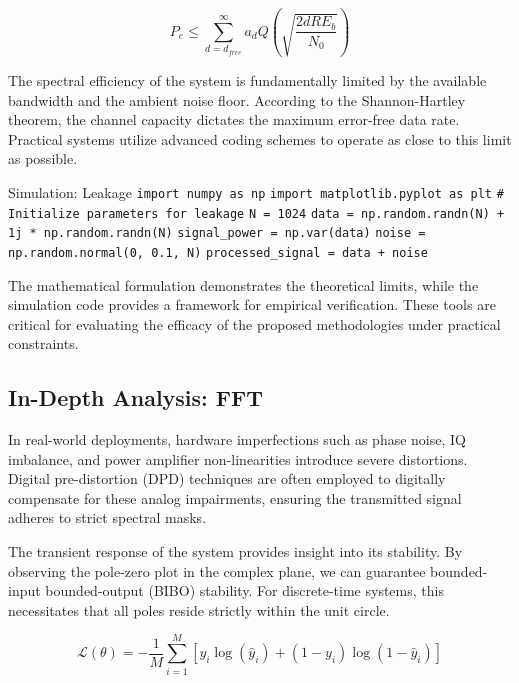 \begin{equation}
    P_e \leq \sum_{d=d_{free}}^{\infty} a_d Q\left(\sqrt{\frac{2 d R E_b}{N_0}}\right)
\end{equation}

The spectral efficiency of the system is fundamentally limited by the available bandwidth and the ambient noise floor. According to the Shannon-Hartley theorem, the channel capacity dictates the maximum error-free data rate. Practical systems utilize advanced coding schemes to operate as close to this limit as possible.

\begin{pythonbox}{Simulation: Leakage}
\texttt{import numpy as np}
\texttt{import matplotlib.pyplot as plt}
\texttt{}
\texttt{\# Initialize parameters for leakage}
\texttt{N = 1024}
\texttt{data = np.random.randn(N) + 1j * np.random.randn(N)}
\texttt{signal\_power = np.var(data)}
\texttt{noise = np.random.normal(0, 0.1, N)}
\texttt{processed\_signal = data + noise}
\end{pythonbox}

\vspace{0.5cm}
The mathematical formulation demonstrates the theoretical limits, while the simulation code provides a framework for empirical verification. These tools are critical for evaluating the efficacy of the proposed methodologies under practical constraints.


\subsection{In-Depth Analysis: FFT}
In real-world deployments, hardware imperfections such as phase noise, IQ imbalance, and power amplifier non-linearities introduce severe distortions. Digital pre-distortion (DPD) techniques are often employed to digitally compensate for these analog impairments, ensuring the transmitted signal adheres to strict spectral masks.

The transient response of the system provides insight into its stability. By observing the pole-zero plot in the complex plane, we can guarantee bounded-input bounded-output (BIBO) stability. For discrete-time systems, this necessitates that all poles reside strictly within the unit circle.

\begin{equation}
    \mathcal{L}(\theta) = -\frac{1}{M} \sum_{i=1}^{M} \left[ y_i \log(\hat{y}_i) + (1-y_i)\log(1-\hat{y}_i) \right]
\end{equation}

